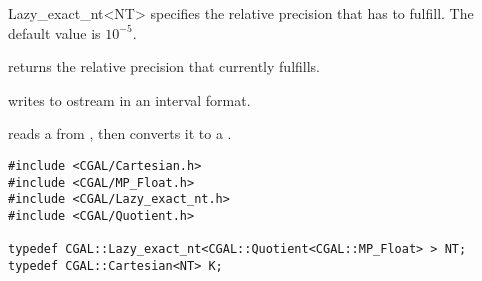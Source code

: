 \begin{ccRefClass} {Lazy_exact_nt<NT>}
{specifies the relative precision that  has to fulfill.
The default value is $10^{-5}$.  }

{returns the relative precision that  currently fulfills.}

{writes  to ostream  in an interval format.}

{reads a  from , then converts it to a .}

\ccExample

\begin{verbatim}
#include <CGAL/Cartesian.h>
#include <CGAL/MP_Float.h>
#include <CGAL/Lazy_exact_nt.h>
#include <CGAL/Quotient.h>

typedef CGAL::Lazy_exact_nt<CGAL::Quotient<CGAL::MP_Float> > NT;
typedef CGAL::Cartesian<NT> K;
\end{verbatim}

\end{ccRefClass} 

